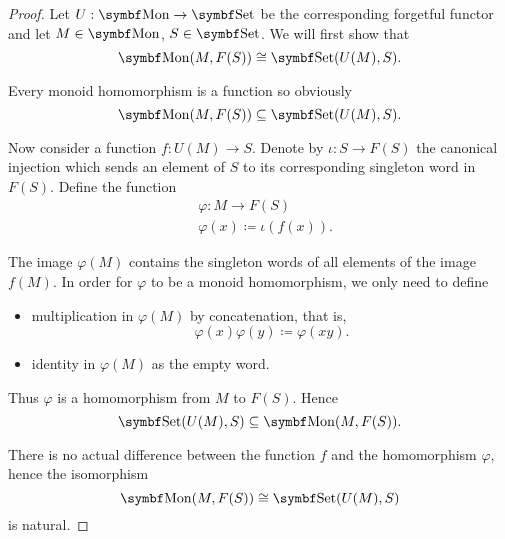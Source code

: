 \begin{proof}
  Let \( U: \Cat{Mon} \to \Cat{Set} \) be the corresponding forgetful functor and let \( M \in \Cat{Mon} \), \( S \in \Cat{Set} \). We will first show that
  \begin{equation*}
    \Cat{Mon}(M, F(S)) \cong \Cat{Set}(U(M), S).
  \end{equation*}

  Every monoid homomorphism is a function so obviously
  \begin{equation*}
    \Cat{Mon}(M, F(S)) \subseteq \Cat{Set}(U(M), S).
  \end{equation*}

  Now consider a function \( f: U(M) \to S \). Denote by \( \iota: S \to F(S) \) the canonical injection which sends an element of \( S \) to its corresponding singleton word in \( F(S) \). Define the function
  \begin{align*}
    &\varphi: M \to F(S) \\
    &\varphi(x) \coloneqq \iota(f(x)).
  \end{align*}

  The image \( \varphi(M) \) contains the singleton words of all elements of the image \( f(M) \). In order for \( \varphi \) to be a monoid homomorphism, we only need to define
  \begin{itemize}
    \item multiplication in \( \varphi(M) \) by concatenation, that is,
    \begin{equation*}
      \varphi(x) \varphi(y) \coloneqq \varphi(xy).
    \end{equation*}

    \item identity in \( \varphi(M) \) as the empty word.
  \end{itemize}

  Thus \( \varphi \) is a homomorphism from \( M \) to \( F(S) \). Hence
  \begin{equation*}
    \Cat{Set}(U(M), S) \subseteq \Cat{Mon}(M, F(S)).
  \end{equation*}

  There is no actual difference between the function \( f \) and the homomorphism \( \varphi \), hence the isomorphism
  \begin{equation*}
    \Cat{Mon}(M, F(S)) \cong \Cat{Set}(U(M), S)
  \end{equation*}
  is natural.
\end{proof}

